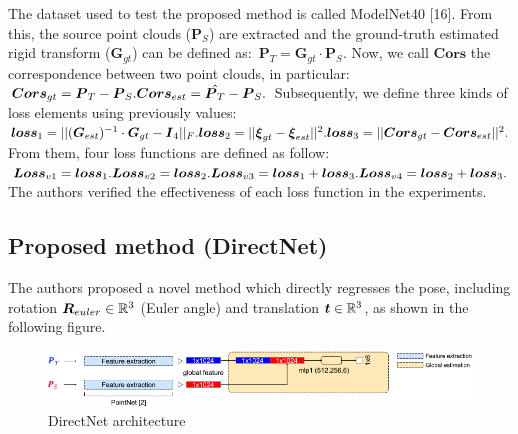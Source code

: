 \newpage
The dataset used to test the proposed method is called ModelNet40
{[}16{]}. From this, the source point clouds ($\boldsymbol{P}_S$) are
extracted and the ground-truth estimated rigid transform
($\boldsymbol{G}_{gt}$) can be defined as:\newline\
$ \boldsymbol {P}_{T} = \boldsymbol {G}_{gt}\cdot \boldsymbol {P}_{S}.$\newline
Now, we call $\boldsymbol{Cors}$ the correspondence between two point
clouds, in particular: \newline
$\boldsymbol {Cors}_{gt} = \boldsymbol {P}_{T} - \boldsymbol {P}_{S}.  \\  \boldsymbol {Cors}_{est} = \hat{\boldsymbol {P}_{T}} - \boldsymbol {P}_{S}.$
\newline
Subsequently, we define three kinds of loss elements using previously
values:
\newline
$ \boldsymbol {loss}_{1} = ||(\boldsymbol {G}_{est})^{-1}\cdot \boldsymbol {G}_{gt} - \boldsymbol {I}_{4}||_{F}. \\ \boldsymbol {loss}_{2} = ||\boldsymbol {\xi }_{gt}-\boldsymbol {\xi }_{est}||^{2}. \\ \boldsymbol {loss}_{3} = ||\boldsymbol {Cors}_{gt} - \boldsymbol {Cors}_{est}||^{2}. $
\newline
From them, four loss functions are defined as follow:
\newline
$ \boldsymbol {Loss}_{v1} = \boldsymbol {loss}_{1}. \\ \boldsymbol {Loss}_{v2} = \boldsymbol {loss}_{2}. \\ \boldsymbol {Loss}_{v3} = \boldsymbol {loss}_{1} + \boldsymbol {loss}_{3}.\\ \boldsymbol {Loss}_{v4} = \boldsymbol {loss}_{2} + \boldsymbol {loss}_{3}.  $
\newline
The authors verified the effectiveness of each loss function in the
experiments.

\subsection{Proposed method (DirectNet)}\label{header-n572}

The authors proposed a novel method which directly regresses the pose,
including rotation $\boldsymbol{R}_{euler} \in \mathbb{R}^3 $ (Euler angle) and
translation $\boldsymbol{t} \in \mathbb{R}^3$, as shown in the following figure.

\begin{figure}[h!]
\centering
\includegraphics[width=0.95\linewidth]{images/directnet.png}
\caption{DirectNet architecture}
\end{figure}

